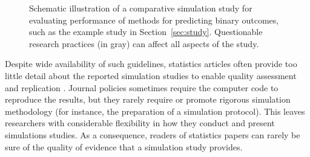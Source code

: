 \documentclass[a4paper, 11pt]{article}
\begin{document}
\begin{figure}[!htb]
{
}
\caption{Schematic illustration of a comparative simulation study for evaluating
performance of methods for predicting binary outcomes, such as the example study
in Section~\ref{sec:study}. Questionable research
practices (in gray) can affect all aspects of the study.}
\label{fig:diagram}
\end{figure}

Despite wide availability of such guidelines, statistics articles often
provide too little detail about the reported simulation studies to enable
quality assessment and replication \citep[see the literature reviews
in][]{Burton2006, Morris2019}. Journal policies sometimes require the computer
code to reproduce the results, but they rarely require or promote
rigorous simulation methodology (for instance, the preparation of a simulation protocol). This
leaves researchers with considerable flexibility in how they conduct and present
simulations studies. As a consequence, readers of statistics papers can
rarely be sure of the quality of evidence that a simulation study provides.
\end{document}
